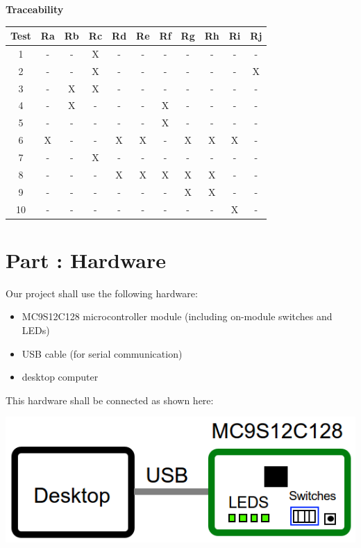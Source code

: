\documentclass{article}
\newcounter{partNum}
\newcommand{\partNum}{%
        \stepcounter{partNum}%
        \thepartNum}
\newcommand{\sectPart}[1]{\section*{Part \partNum: #1}}
\begin{document}
\vspace*{2em}

\begin{center}
    \textbf{Traceability} \\
    \vspace{0.5em}
    \begin{tabular}{| c | c | c | c | c | c | c | c | c | c | c |}
    \hline
    Test & Ra & Rb & Rc & Rd & Re & Rf & Rg & Rh & Ri & Rj \\ \hline
    1    & -  & -  & X  & -  & -  & -  & -  & -  & -  & -  \\ \hline
    2    & -  & -  & X  & -  & -  & -  & -  & -  & -  & X  \\ \hline
    3    & -  & X  & X  & -  & -  & -  & -  & -  & -  & -  \\ \hline
    4    & -  & X  & -  & -  & -  & X  & -  & -  & -  & -  \\ \hline
    5    & -  & -  & -  & -  & -  & X  & -  & -  & -  & -  \\ \hline
    6    & X  & -  & -  & X  & X  & -  & X  & X  & X  & -  \\ \hline
    7    & -  & -  & X  & -  & -  & -  & -  & -  & -  & -  \\ \hline
    8    & -  & -  & -  & X  & X  & X  & X  & X  & -  & -  \\ \hline
    9    & -  & -  & -  & -  & -  & -  & X  & X  & -  & -  \\ \hline
    10   & -  & -  & -  & -  & -  & -  & -  & -  & X  & -  \\ \hline
    \end{tabular}
\end{center}


\newpage

\sectPart{Hardware}

Our project shall use the following hardware:
\begin{itemize}
    \item MC9S12C128 microcontroller module (including on-module switches and LEDs)
    \item USB cable (for serial communication)
    \item desktop computer
\end{itemize}
This hardware shall be connected as shown here:\\

\begin{center}
    \includegraphics[scale=0.5]{hardware.png}
\end{center}
\end{document}
